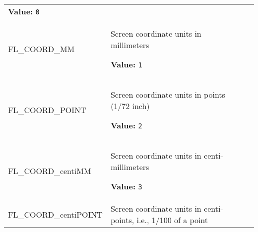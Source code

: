 \begin{longtable}{|p{\varnamewidth}|p{\vardescrwidth}|l}
\textbf{Value:} 
{\tt 0}&\\
\cline{1-2}
\raggedright F\-L\-\_\-C\-O\-O\-R\-D\-\_\-M\-M\- & \raggedright Screen coordinate units in millimeters

\textbf{Value:} 
{\tt 1}&\\
\cline{1-2}
\raggedright F\-L\-\_\-C\-O\-O\-R\-D\-\_\-P\-O\-I\-N\-T\- & \raggedright Screen coordinate units in points (1/72 inch)

\textbf{Value:} 
{\tt 2}&\\
\cline{1-2}
\raggedright F\-L\-\_\-C\-O\-O\-R\-D\-\_\-c\-e\-n\-t\-i\-M\-M\- & \raggedright Screen coordinate units in centi-millimeters

\textbf{Value:} 
{\tt 3}&\\
\cline{1-2}
\raggedright F\-L\-\_\-C\-O\-O\-R\-D\-\_\-c\-e\-n\-t\-i\-P\-O\-I\-N\-T\- & \raggedright Screen coordinate units in centi-points, i.e., 1/100 of a point


\end{longtable}
